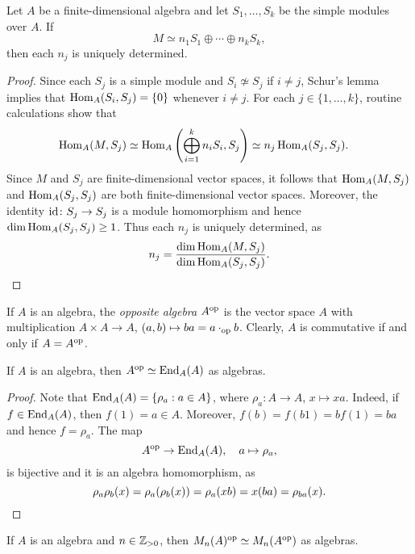 \begin{theorem}
Let $A$ be a finite-dimensional algebra and let 
$S_1,\dots,S_k$ be the simple modules over $A$. 
If 
\[
M\simeq n_1S_1\oplus\cdots\oplus n_kS_k,
\]
then each $n_j$ is uniquely determined.  
\end{theorem}

\begin{proof}
	Since each $S_j$ is a simple module 
    and $S_i\not\simeq S_j$ if $i\ne j$, 
    Schur's lemma implies that 
	$\operatorname{Hom}_A(S_i,S_j)=\{0\}$ whenever $i\ne j$. 
	For each $j\in\{1,\dots,k\}$, routine calculations show that 
	\begin{align*}
		\operatorname{Hom}_A(M,S_j) &\simeq \operatorname{Hom}_A\left(\bigoplus_{i=1}^k n_i S_i,S_j\right)
		\simeq n_j\operatorname{Hom}_A(S_j,S_j). 
	\end{align*} 
	Since $M$ and $S_j$ are finite-dimensional vector spaces, it follows that
	$\operatorname{Hom}_A(M,S_j)$ and $\operatorname{Hom}_A(S_j,S_j)$ 
	are both finite-dimensional vector spaces.  
	Moreover, the identity $\operatorname{id}\colon S_j\to S_j$ 
	is a module homomorphism and hence  
	$\dim\operatorname{Hom}_A(S_j,S_j)\geq 1$. 
	Thus each $n_j$ is uniquely determined, as  
	\[ 
	n_j=\frac{\dim\operatorname{Hom}_A(M,S_j)}{\dim\operatorname{Hom}_A(S_j,S_j)}.\qedhere
	\]
\end{proof}

If $A$ is an algebra, the \emph{opposite algebra} $A^{\operatorname{op}}$ is the vector space 
$A$ with multiplication $A\times A\to A$, $(a,b)\mapsto ba=a\cdot_{\operatorname{op}}b$. Clearly,
$A$ is commutative if and only if $A=A^{\operatorname{op}}$. 

\begin{lemma}
	\label{lem:A^op}
    If $A$ is an algebra, then $A^{\operatorname{op}}\simeq\operatorname{End}_A(A)$ as algebras.  
\end{lemma}

\begin{proof}
	Note that $\operatorname{End}_A(A)=\{\rho_a:a\in A\}$, where $\rho_a\colon
	A\to A$, $x\mapsto xa$. Indeed, if $f\in\operatorname{End}_A(A)$, then 
	$f(1)=a\in A$. Moreover, $f(b)=f(b1)=bf(1)=ba$ and hence 
	$f=\rho_a$. The map 
    \[
    A^{\operatorname{op}}\to \operatorname{End}_A(A),\quad a\mapsto\rho_a,
    \]
	is bijective and it is an algebra homomorphism, as 
    \[
		\rho_a\rho_b(x)=\rho_a(\rho_b(x))=\rho_a(xb)=x(ba)=\rho_{ba}(x).\qedhere
    \]
\end{proof}

\begin{lemma}
	\label{lem:Mn_op}
	If $A$ is an algebra and $n\in\mathbb{Z}_{>0}$, then $M_n(A)^{\operatorname{op}}\simeq
	M_n(A^{\operatorname{op}})$ as algebras.   
\end{lemma}


